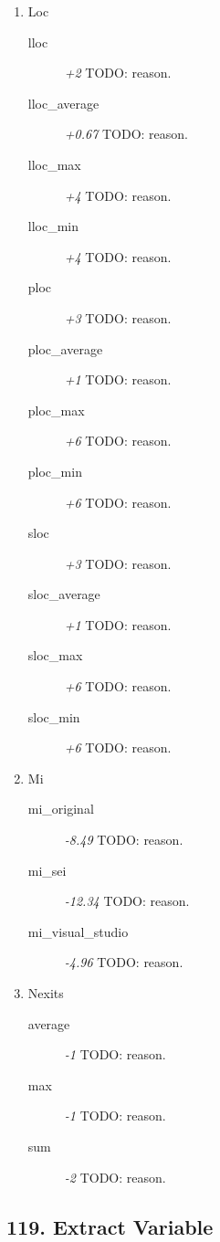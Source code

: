 \begin{enumerate}
\begin{description}
        \end{description}
  \item Loc
        \begin{description}
          \item [lloc] \textit{+2} TODO: reason.
          \item [lloc\_average] \textit{+0.67} TODO: reason.
          \item [lloc\_max] \textit{+4} TODO: reason.
          \item [lloc\_min] \textit{+4} TODO: reason.
          \item [ploc] \textit{+3} TODO: reason.
          \item [ploc\_average] \textit{+1} TODO: reason.
          \item [ploc\_max] \textit{+6} TODO: reason.
          \item [ploc\_min] \textit{+6} TODO: reason.
          \item [sloc] \textit{+3} TODO: reason.
          \item [sloc\_average] \textit{+1} TODO: reason.
          \item [sloc\_max] \textit{+6} TODO: reason.
          \item [sloc\_min] \textit{+6} TODO: reason.
        \end{description}
  \item Mi
        \begin{description}
          \item [mi\_original] \textit{-8.49} TODO: reason.
          \item [mi\_sei] \textit{-12.34} TODO: reason.
          \item [mi\_visual\_studio] \textit{-4.96} TODO: reason.
        \end{description}
  \item Nexits
        \begin{description}
          \item [average] \textit{-1} TODO: reason.
          \item [max] \textit{-1} TODO: reason.
          \item [sum] \textit{-2} TODO: reason.
        \end{description}
\end{enumerate}
\subsection{119. Extract Variable}

